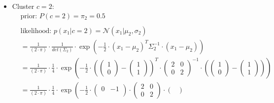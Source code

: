 \documentclass[12pt]{article}
\begin{document}
\begin{enumerate}
\begin{enumerate}[label=\arabic*)]
\begin{itemize}[label=]
            \item Cluster $c=2$:
            \begin{equation*}
                \begin{aligned}
                    &\text{prior: } P(c=2) = \pi_2 = \mathbf{0.5} \\
                    \\
                    &\text{likelihood: } p(x_1|c=2) = \mathcal{N}(x_1| \mu_2, \sigma_2) \\
                    &= \frac{1}{(2 \cdot \pi)} \cdot \frac{1}{det(\Sigma_2)} \cdot \exp \left( -\frac{1}{2} \cdot (x_1 - \mu_2)^{T} \Sigma_2^{-1} \cdot (x_1 - \mu_2) \right)\\
                    &= \frac{1}{(2 \cdot \pi)} \cdot \frac{1}{4} \cdot \exp \left( -\frac{1}{2} \cdot \left(\begin{pmatrix}
                    1\\
                    0
                    \end{pmatrix} - \begin{pmatrix}
                    1\\
                    1
                    \end{pmatrix}\right)^{T} \cdot \begin{pmatrix}
                    2 & 0\\
                    0 & 2
                    \end{pmatrix}^{-1} \cdot \left(\begin{pmatrix}
                    1\\
                    0
                    \end{pmatrix} - \begin{pmatrix}
                    1\\
                    1
                    \end{pmatrix}\right) \right)\\
                    &= \frac{1}{(2 \cdot \pi)} \cdot \frac{1}{4} \cdot \exp \left( -\frac{1}{2} \cdot \begin{pmatrix}
                    0 & -1\\
                    \end{pmatrix} \cdot \begin{pmatrix}
                    2 & 0\\
                    0 & 2
                    \end{pmatrix} \cdot \begin{pmatrix}

\end{pmatrix}
\end{aligned}
\end{equation*}
\end{itemize}
\end{enumerate}
\end{enumerate}
\end{document}
